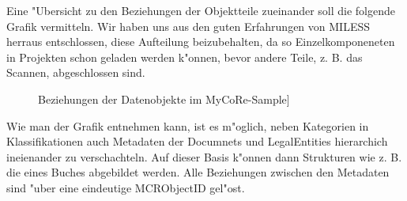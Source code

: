 Eine "Ubersicht zu den Beziehungen der Objektteile zueinander soll die folgende Grafik vermitteln. Wir haben uns aus den guten Erfahrungen von MILESS herraus entschlossen, diese Aufteilung beizubehalten, da so Einzelkomponeneten in Projekten schon geladen werden k"onnen, bevor andere Teile, z. B. das Scannen, abgeschlossen sind. \\
\begin{figure}[H]
\begin{center}
 \caption [Beziehungen der Datenobjekte im MyCoRe-Sample]{Beziehungen der Datenobjekte im MyCoRe-Sample]}
\end{center}
\end{figure}
Wie man der Grafik entnehmen kann, ist es m"oglich, neben Kategorien in Klassifikationen auch Metadaten der Documnets und LegalEntities hierarchich ineienander zu verschachteln. Auf dieser Basis k"onnen dann Strukturen wie z. B. die eines Buches abgebildet werden. Alle Beziehungen zwischen den Metadaten sind "uber eine eindeutige MCRObjectID gel"ost. \\
